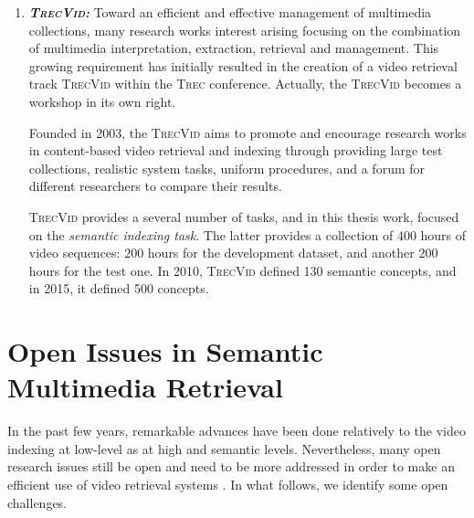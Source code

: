\begin{enumerate}
			\item \textit{\textbf{\textsc{TrecVid:}}} Toward an efficient and effective management 
			of multimedia collections, many research works interest arising focusing on the combination 
			of multimedia interpretation, extraction, retrieval and management. This growing requirement 
			has initially resulted in the creation of a video retrieval track \textsc{TrecVid} within the 
			\textsc{Trec} conference. Actually, the \textsc{TrecVid} becomes a workshop in its own right.

			Founded in 2003, the \textsc{TrecVid} aims to promote and encourage research works in 
			content-based video retrieval and indexing through providing large test collections, 
			realistic system tasks, uniform procedures, and a forum for different researchers to 
			compare their results.

			\textsc{TrecVid} provides a several number of tasks, and in this thesis work,  focused 
			on the \emph{semantic indexing task}. The latter provides a collection of $400$ hours of 
			video sequences: $200$ hours for the development dataset, and another $200$ hours for the test one. 
			In 2010, \textsc{TrecVid} defined 130 semantic concepts, and in 2015, it defined 500 concepts.

		\end{enumerate}


	\section{Open Issues in Semantic Multimedia Retrieval}

	In the past few years, remarkable advances have been done relatively 
	to the video indexing at low-level as at high and semantic levels. Nevertheless, many open research 
	issues still be open and need to be more addressed in order to make an efficient use of video retrieval 
	systems \citep{Hole2015,Tunga2015}. In what follows, we identify some open challenges.

